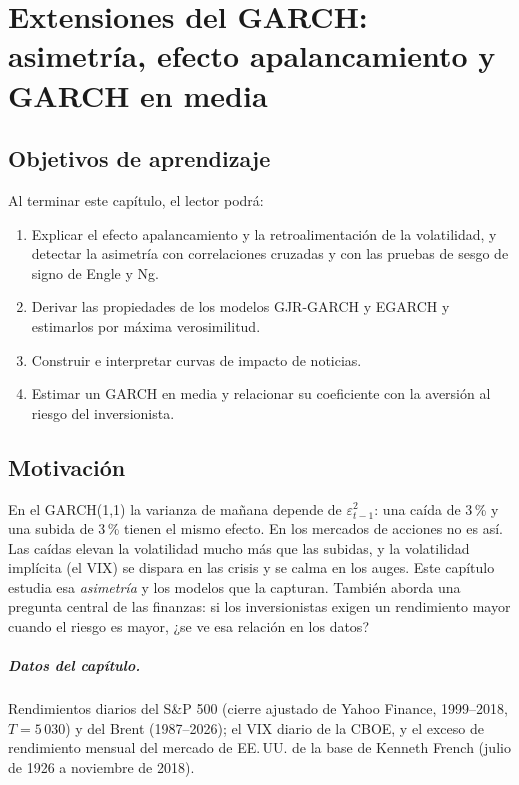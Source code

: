 \chapter[Extensiones del GARCH]{Extensiones del GARCH: asimetría, efecto apalancamiento y GARCH en media}\label{cap:asimetria}

\section*{Objetivos de aprendizaje}
Al terminar este capítulo, el lector podrá:
\begin{enumerate}[label=\arabic*.,leftmargin=*]
  \item Explicar el efecto apalancamiento y la retroalimentación de la volatilidad, y detectar la asimetría con
        correlaciones cruzadas y con las pruebas de sesgo de signo de Engle y Ng.
  \item Derivar las propiedades de los modelos GJR-GARCH y EGARCH y estimarlos por máxima verosimilitud.
  \item Construir e interpretar curvas de impacto de noticias.
  \item Estimar un GARCH en media y relacionar su coeficiente con la aversión al riesgo del inversionista.
\end{enumerate}

\section*{Motivación}
En el GARCH(1,1) la varianza de mañana depende de $\varepsilon_{t-1}^2$: una caída de 3\,\% y una subida de
3\,\% tienen el mismo efecto. En los mercados de acciones no es así. Las caídas elevan la volatilidad mucho
más que las subidas, y la volatilidad implícita (el VIX) se dispara en las crisis y se calma en los auges. Este
capítulo estudia esa \emph{asimetría} y los modelos que la capturan. También aborda una pregunta central de las
finanzas: si los inversionistas exigen un rendimiento mayor cuando el riesgo es mayor, ¿se ve esa relación en
los datos?

\paragraph{Datos del capítulo.} Rendimientos diarios del S\&P 500 (cierre ajustado de Yahoo Finance, 1999--2018,
$T=5\,030$) y del Brent (1987--2026); el VIX diario de la CBOE, y el exceso de rendimiento mensual del mercado
de EE.\,UU. de la base de Kenneth French (julio de 1926 a noviembre de 2018).

